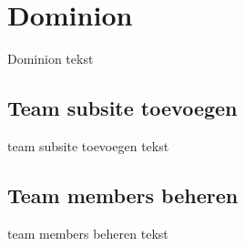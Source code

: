 \section{Dominion}\label{dominion}
Dominion tekst

\subsection{Team subsite toevoegen}\label{teamsubsitetoevoegen}
team subsite toevoegen tekst

\subsection{Team members beheren}\label{teammembersbeheren}
team members beheren tekst